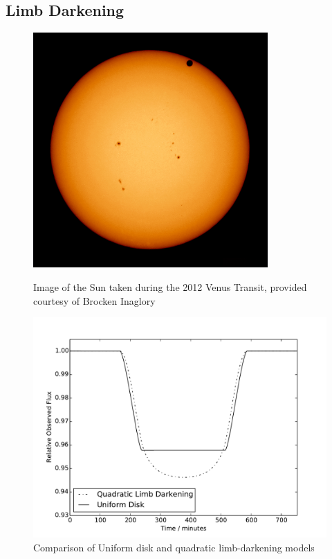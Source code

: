 \subsection{Limb Darkening}
\begin{figure}[\here]
    \centering
    \begin{minipage}[b]{\figwidth}
        \centering
        \includegraphics[width=0.8\textwidth]{images/venus_transit.jpg}
        \caption{Image of the Sun taken during the 2012 Venus Transit, provided courtesy of Brocken Inaglory}
        \label{fig:limb_darkening_image}
    \end{minipage}\quad\quad
    \begin{minipage}[b]{\figwidth}
        \includegraphics[width=\textwidth]{images/model_comparison.pdf}
        \caption{Comparison of Uniform disk and quadratic limb-darkening models}
        \label{fig:model_comparison}
    \end{minipage}
\end{figure}

